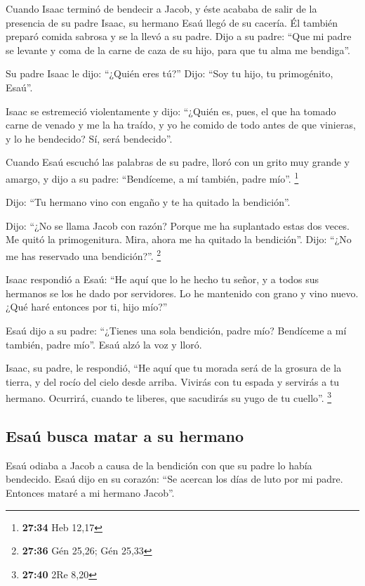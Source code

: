 \begin{paracol}{2}
 Cuando Isaac terminó de bendecir a Jacob, y éste acababa
de salir de la presencia de su padre Isaac, su hermano Esaú llegó de su
cacería.  Él también preparó comida sabrosa y se la llevó
a su padre. Dijo a su padre: ``Que mi padre se levante y coma de la
carne de caza de su hijo, para que tu alma me bendiga''.

 Su padre Isaac le dijo: ``¿Quién eres tú?'' Dijo: ``Soy
tu hijo, tu primogénito, Esaú''.

 Isaac se estremeció violentamente y dijo: ``¿Quién es,
pues, el que ha tomado carne de venado y me la ha traído, y yo he comido
de todo antes de que vinieras, y lo he bendecido? Sí, será bendecido''.

 Cuando Esaú escuchó las palabras de su padre, lloró con
un grito muy grande y amargo, y dijo a su padre: ``Bendíceme, a mí
también, padre mío''. \footnote{\textbf{27:34} Heb 12,17}

 Dijo: ``Tu hermano vino con engaño y te ha quitado la
bendición''.

 Dijo: ``¿No se llama Jacob con razón? Porque me ha
suplantado estas dos veces. Me quitó la primogenitura. Mira, ahora me ha
quitado la bendición''. Dijo: ``¿No me has reservado una bendición?''.
\footnote{\textbf{27:36} Gén 25,26; Gén 25,33}

 Isaac respondió a Esaú: ``He aquí que lo he hecho tu
señor, y a todos sus hermanos se los he dado por servidores. Lo he
mantenido con grano y vino nuevo. ¿Qué haré entonces por ti, hijo mío?''

 Esaú dijo a su padre: ``¿Tienes una sola bendición,
padre mío? Bendíceme a mí también, padre mío''. Esaú alzó la voz y
lloró.

 Isaac, su padre, le respondió, ``He aquí que tu morada
será de la grosura de la tierra, y del rocío del cielo desde arriba.
 Vivirás con tu espada y servirás a tu hermano. Ocurrirá,
cuando te liberes, que sacudirás su yugo de tu cuello''. \footnote{\textbf{27:40}
  2Re 8,20}

\hypertarget{esauxfa-busca-matar-a-su-hermano}{%
\subsection{Esaú busca matar a su
hermano}\label{esauxfa-busca-matar-a-su-hermano}}

 Esaú odiaba a Jacob a causa de la bendición con que su
padre lo había bendecido. Esaú dijo en su corazón: ``Se acercan los días
de luto por mi padre. Entonces mataré a mi hermano Jacob''.


\end{paracol}
